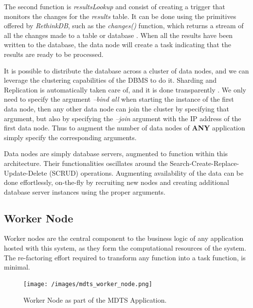 \documentclass[12pt, titlepage]{uo_temp}
\begin{document}
     The second function is \emph{resultsLookup} and consist of creating a trigger that
     monitors the changes for the \emph{results} table. It can be done using the
     primitives offered by \emph{RethinkDB}, such as the \emph{changes()} function, which
     returns a stream of all the changes made to a table or database
     \cite{rethinkdb}. When all the results have been written to the database, the data
     node will create a task indicating that the results are ready to be processed.
    
     It is possible to distribute the database across a cluster of data nodes, and we can
     leverage the clustering capabilities of the DBMS to do it. Sharding and Replication
     is automatically taken care of, and it is done transparently \cite{rethinkdb}. We
     only need to specify the argument \emph{--bind all} when starting the instance of the
     first data node, then any other data node can join the cluster by specifying that
     argument, but also by specifying the \emph{--join} argument with the IP address of
     the first data node. Thus to augment the number of data nodes of \textbf{ANY}
     application simply specify the corresponding arguments.

     Data nodes are simply database servers, augmented to function within this
     architecture. Their functionalities oscillates around the
     Search-Create-Replace-Update-Delete (SCRUD) operations. Augmenting availability of
     the data can be done effortlessly, on-the-fly by recruiting new nodes and creating
     additional database server instances using the proper arguments.
    
     \subsection{Worker Node}
     Worker nodes are the central component to the business logic of any application
     hosted with this system, as they form the computational resources of the
     system. The re-factoring effort required to transform any function into a task
     function, is minimal.

     \begin{figure}[h]
       \texttt{[image: /images/mdts\_worker\_node.png]}
       \caption{Worker Node as part of the MDTS Application.}
     \end{figure}
\end{document}

